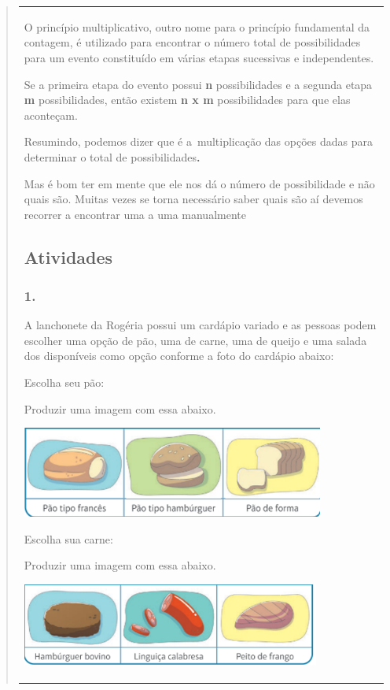 \begin{enumerate}
\begin{escolha}
\begin{enumerate}
\begin{itemize}
\begin{itemize}
\begin{escolha}
\begin{quote}
\begin{escolha}
{\begin{longtable}[]{@{}l@{}}
\begin{itemize}
O princípio multiplicativo, outro nome para o princípio fundamental da
contagem, é utilizado para encontrar o número total de possibilidades
para um evento constituído em várias etapas sucessivas e independentes.

Se a primeira etapa do evento possui \textbf{n} possibilidades e a
segunda etapa \textbf{m} possibilidades, então existem \textbf{n x m}
possibilidades para que elas aconteçam.

Resumindo, podemos dizer que é a~multiplicação das opções dadas para
determinar o total de possibilidades\textbf{.}

Mas é bom ter em mente que ele nos dá o número de possibilidade e não
quais são. Muitas vezes se torna necessário saber quais são aí devemos
recorrer a encontrar uma a uma manualmente

\subsection{Atividades}\label{atividades-10}

\subsubsection{1.}\label{section-130}

A lanchonete da Rogéria possui um cardápio variado e as pessoas podem
escolher uma opção de pão, uma de carne, uma de queijo e uma salada dos
disponíveis como opção conforme a foto do cardápio abaixo:

Escolha seu pão:

Produzir uma imagem com essa abaixo.

\includegraphics[width=3.91667in,height=1.17426in]{media/image134.png}

Escolha sua carne:

Produzir uma imagem com essa abaixo.

\includegraphics[width=3.86538in,height=1.06976in]{media/image135.png}


\end{itemize}
\end{longtable}}
\end{escolha}
\end{quote}
\end{escolha}
\end{itemize}
\end{itemize}
\end{enumerate}
\end{escolha}
\end{enumerate}
